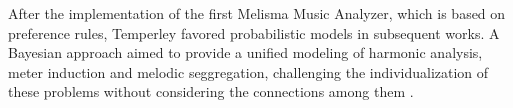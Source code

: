 


After the implementation of the first Melisma Music
Analyzer, which is based on preference rules, Temperley
favored probabilistic models in subsequent works. A Bayesian
approach aimed to provide a unified modeling of harmonic
analysis, meter induction and melodic seggregation,
challenging the individualization of these problems without
considering the connections among them
\cite{temperley2009unified}.


